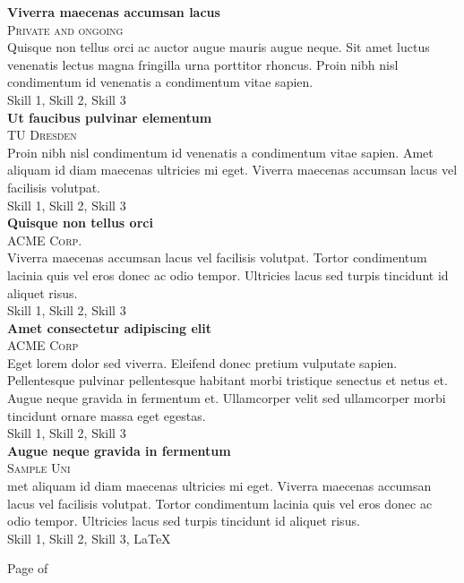 \documentclass[twoside]{article}
\begin{document}
{\begin{minipage}[t][\dimexpr\textheight-2\fboxrule-2\fboxsep\relax][t]{\dimexpr0.6\textwidth-2\fboxrule-2\fboxsep\relax}
\begin{justify}
        {\large \textbf{Viverra maecenas accumsan lacus}} \\
        {\scshape{}\selectfont\footnotesize Private  and ongoing} \\
        Quisque non tellus orci ac auctor augue mauris augue neque. Sit amet luctus venenatis lectus magna fringilla urna porttitor rhoncus. Proin nibh nisl condimentum id venenatis a condimentum vitae sapien. \\[1ex]
        Skill 1, Skill 2, Skill 3 \\
        
        {\large \textbf{Ut faucibus pulvinar elementum}} \\
        {\scshape{}\selectfont\footnotesize TU Dresden } \\
        Proin nibh nisl condimentum id venenatis a condimentum vitae sapien. Amet aliquam id diam maecenas ultricies mi eget. Viverra maecenas accumsan lacus vel facilisis volutpat. \\[1ex]
        Skill 1, Skill 2, Skill 3 \\

        {\large \textbf{Quisque non tellus orci}} \\
        {\scshape{}\selectfont\footnotesize ACME Corp. } \\
        Viverra maecenas accumsan lacus vel facilisis volutpat. Tortor condimentum lacinia quis vel eros donec ac odio tempor. Ultricies lacus sed turpis tincidunt id aliquet risus. \\[1ex]
        Skill 1, Skill 2, Skill 3 \\
        
        {\large \textbf{Amet consectetur adipiscing elit}} \\
        {\scshape{}\selectfont\footnotesize ACME Corp } \\
        Eget lorem dolor sed viverra. Eleifend donec pretium vulputate sapien. Pellentesque pulvinar pellentesque habitant morbi tristique senectus et netus et. Augue neque gravida in fermentum et. Ullamcorper velit sed ullamcorper morbi tincidunt ornare massa eget egestas. \\[1ex]
        Skill 1, Skill 2, Skill 3 \\
        
        {\large \textbf{Augue neque gravida in fermentum}} \\
        {\scshape{}\selectfont\footnotesize Sample Uni } \\
        met aliquam id diam maecenas ultricies mi eget. Viverra maecenas accumsan lacus vel facilisis volutpat. Tortor condimentum lacinia quis vel eros donec ac odio tempor. Ultricies lacus sed turpis tincidunt id aliquet risus. \\[1ex]
        Skill 1, Skill 2, Skill 3, \LaTeX 
        \end{justify}
        \vfill%
        {\hfill\small{}\selectfont Page \thepage of \pageref{LastPage}\hfill}
    \end{minipage}
}
\end{document}

